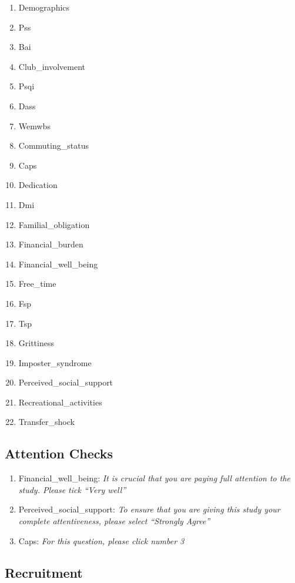 \documentclass[]{book}
\providecommand{\tightlist}{%
  \setlength{\itemsep}{0pt}\setlength{\parskip}{0pt}}
\begin{document}
\begin{enumerate}
\def\labelenumi{\arabic{enumi}.}
\tightlist
\item
  Demographics
\item
  Pss
\item
  Bai
\item
  Club\_involvement
\item
  Psqi
\item
  Dass
\item
  Wemwbs
\item
  Commuting\_status
\item
  Caps
\item
  Dedication
\item
  Dmi
\item
  Familial\_obligation
\item
  Financial\_burden
\item
  Financial\_well\_being
\item
  Free\_time
\item
  Fsp
\item
  Tsp
\item
  Grittiness
\item
  Imposter\_syndrome
\item
  Perceived\_social\_support
\item
  Recreational\_activities
\item
  Transfer\_shock
\end{enumerate}

\hypertarget{attention-checks}{%
\subsection{Attention Checks}\label{attention-checks}}

\begin{enumerate}
\def\labelenumi{\arabic{enumi}.}
\tightlist
\item
  Financial\_well\_being:
  \emph{It is crucial that you are paying full attention to the study. Please tick ``Very well''}
\item
  Perceived\_social\_support:
  \emph{To ensure that you are giving this study your complete attentiveness, please select ``Strongly Agree''}
\item
  Caps:
  \emph{For this question, please click number 3}
\end{enumerate}

\hypertarget{recruitment}{%
\subsection{Recruitment}\label{recruitment}}
\end{document}
